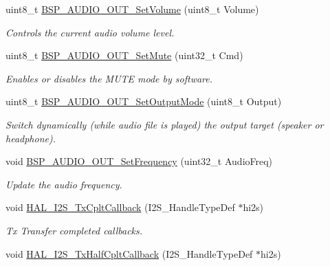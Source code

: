 \begin{DoxyCompactItemize}
uint8\+\_\+t \mbox{\hyperlink{group___s_t_m32_f4___d_i_s_c_o_v_e_r_y___a_u_d_i_o___o_u_t___private___functions_ga2929e2c81c7ca31f8f52622a06ab4900}{B\+S\+P\+\_\+\+A\+U\+D\+I\+O\+\_\+\+O\+U\+T\+\_\+\+Set\+Volume}} (uint8\+\_\+t Volume)
\begin{DoxyCompactList}\small\item\em Controls the current audio volume level. \end{DoxyCompactList}\item 
uint8\+\_\+t \mbox{\hyperlink{group___s_t_m32_f4___d_i_s_c_o_v_e_r_y___a_u_d_i_o___o_u_t___private___functions_ga6f0fdfb8396ba31eaebb8ff530de3dd3}{B\+S\+P\+\_\+\+A\+U\+D\+I\+O\+\_\+\+O\+U\+T\+\_\+\+Set\+Mute}} (uint32\+\_\+t Cmd)
\begin{DoxyCompactList}\small\item\em Enables or disables the M\+U\+TE mode by software. \end{DoxyCompactList}\item 
uint8\+\_\+t \mbox{\hyperlink{group___s_t_m32_f4___d_i_s_c_o_v_e_r_y___a_u_d_i_o___o_u_t___private___functions_gacd0d9e6eb0ff2569cf6c4b92fc359484}{B\+S\+P\+\_\+\+A\+U\+D\+I\+O\+\_\+\+O\+U\+T\+\_\+\+Set\+Output\+Mode}} (uint8\+\_\+t Output)
\begin{DoxyCompactList}\small\item\em Switch dynamically (while audio file is played) the output target (speaker or headphone). \end{DoxyCompactList}\item 
void \mbox{\hyperlink{group___s_t_m32_f4___d_i_s_c_o_v_e_r_y___a_u_d_i_o___o_u_t___private___functions_gaf9159656c0f4dde08c62334a25d4b106}{B\+S\+P\+\_\+\+A\+U\+D\+I\+O\+\_\+\+O\+U\+T\+\_\+\+Set\+Frequency}} (uint32\+\_\+t Audio\+Freq)
\begin{DoxyCompactList}\small\item\em Update the audio frequency. \end{DoxyCompactList}\item 
void \mbox{\hyperlink{group___s_t_m32_f4___d_i_s_c_o_v_e_r_y___a_u_d_i_o___o_u_t___private___functions_ga1ef4021384eddbd41ca60454a2483bf3}{H\+A\+L\+\_\+\+I2\+S\+\_\+\+Tx\+Cplt\+Callback}} (I2\+S\+\_\+\+Handle\+Type\+Def $\ast$hi2s)
\begin{DoxyCompactList}\small\item\em Tx Transfer completed callbacks. \end{DoxyCompactList}\item 
void \mbox{\hyperlink{group___s_t_m32_f4___d_i_s_c_o_v_e_r_y___a_u_d_i_o___o_u_t___private___functions_ga5bef3c73683b81e822368c9029e495bc}{H\+A\+L\+\_\+\+I2\+S\+\_\+\+Tx\+Half\+Cplt\+Callback}} (I2\+S\+\_\+\+Handle\+Type\+Def $\ast$hi2s)

\end{DoxyCompactItemize}
